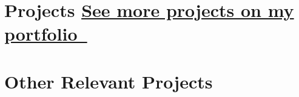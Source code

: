 \section*{Projects \hfill \href{https://harshanalf.netlify.app/projects}{See more projects on my portfolio~}}

\ProjectNumberingtrue
\setcounter{projectCount}{0}









\section*{Other Relevant Projects}







\BigDivider
